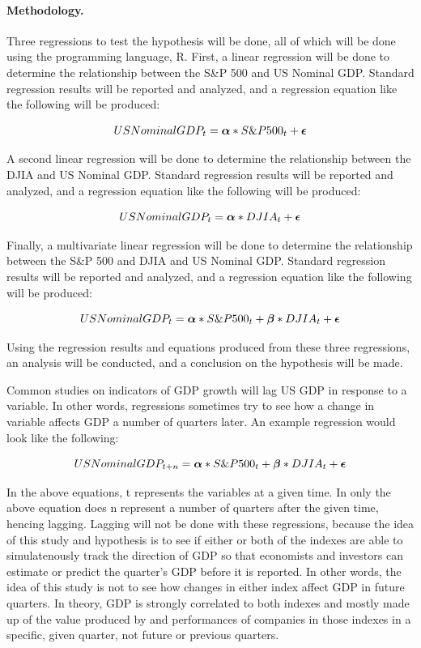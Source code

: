 \documentclass[11pt]{article}
\numberwithin{equation}{section}
\def\alp{\mbox{\boldmath$\alpha$\unboldmath}}
\def\bet{\mbox{\boldmath$\beta$\unboldmath}}
\def\epsi{\mbox{\boldmath$\epsilon$\unboldmath}}
\begin{document}
\paragraph{Methodology.}
Three regressions to test the hypothesis will be done, all of which will be done using the programming language, R. First, a linear regression will be done to determine the relationship between the S\&P 500 and US Nominal GDP. Standard regression results will be reported and analyzed, and a regression equation like the following will be produced:

\[ US Nominal GDP_{t} = \alp*S\&P500_{t} + \epsi \]

A second linear regression will be done to determine the relationship between the DJIA and US Nominal GDP. Standard regression results will be reported and analyzed, and a regression equation like the following will be produced:

\[ US Nominal GDP_{t} = \alp*DJIA_{t} + \epsi \]

Finally, a multivariate linear regression will be done to determine the relationship between the S\&P 500 and DJIA and US Nominal GDP. Standard regression results will be reported and analyzed, and a regression equation like the following will be produced:

\[ US Nominal GDP_{t} = \alp*S\&P500_{t} + \bet*DJIA_{t} + \epsi \]

Using the regression results and equations produced from these three regressions, an analysis will be conducted, and a conclusion on the hypothesis will be made.

Common studies on indicators of GDP growth will lag US GDP in response to a variable. In other words, regressions sometimes try to see how a change in variable affects GDP a number of quarters later. An example regression would look like the following:

\[ US Nominal GDP_{t+n} = \alp*S\&P500_{t} + \bet*DJIA_{t} + \epsi \]

In the above equations, t represents the variables at a given time. In only the above equation does n represent a number of quarters after the given time, hencing lagging. Lagging will not be done with these regressions, because the idea of this study and hypothesis is to see if either or both of the indexes are able to simulatenously track the direction of GDP so that economists and investors can estimate or predict the quarter's GDP before it is reported. In other words, the idea of this study is not to see how changes in either index affect GDP in future quarters. In theory, GDP is strongly correlated to both indexes and mostly made up of the value produced by and performances of companies in those indexes in a specific, given quarter, not future or previous quarters.
\end{document}
